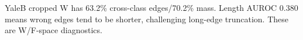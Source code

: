 YaleB cropped W has 63.2\% cross-class edges/70.2\% mass. Length AUROC 0.380 means wrong edges tend to be shorter, challenging long-edge truncation. These are W/F-space diagnostics.
